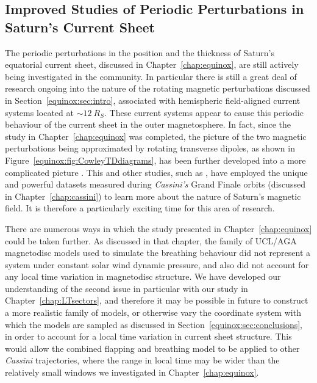 \subsection{Improved Studies of Periodic Perturbations in Saturn's Current Sheet}\label{conclusions:sec:perturbations}
The periodic perturbations in the position and the thickness of Saturn's equatorial current sheet, discussed in Chapter~\ref{chap:equinox}, are still actively being investigated in the community. In particular there is still a great deal of research ongoing into the nature of the rotating magnetic perturbations discussed in Section~\ref{equinox:sec:intro}, associated with hemispheric field-aligned current systems located at ${\sim}\SI{12}{R_S}$. These current systems appear to cause this periodic behaviour of the current sheet in the outer magnetosphere. In fact, since the study in Chapter~\ref{chap:equinox} was completed, the picture of the two magnetic perturbations being approximated by rotating transverse dipoles, as shown in Figure~\ref{equinox:fig:CowleyTDdiagrams}, has been further developed into a more complicated picture \citep[see][Figure 13]{provan2018}. This and other studies, such as \citet{dougherty2018}, have employed the unique and powerful datasets measured during \textit{Cassini's} Grand Finale orbits (discussed in Chapter~\ref{chap:cassini}) to learn more about the nature of Saturn's magnetic field. It is therefore a particularly exciting time for this area of research.

There are numerous ways in which the study presented in Chapter~\ref{chap:equinox} could be taken further. As discussed in that chapter, the family of UCL/AGA magnetodisc models used to simulate the breathing behaviour did not represent a system under constant solar wind dynamic pressure, and also did not account for any local time variation in magnetodisc structure. We have developed our understanding of the second issue in particular with our study in Chapter~\ref{chap:LTsectors}, and therefore it may be possible in future to construct a more realistic family of models, or otherwise vary the coordinate system with which the models are sampled as discussed in Section~\ref{equinox:sec:conclusions}, in order to account for a local time variation in current sheet structure. This would allow the combined flapping and breathing model to be applied to other \textit{Cassini} trajectories, where the range in local time may be wider than the relatively small windows we investigated in Chapter~\ref{chap:equinox}.

